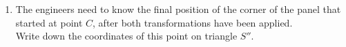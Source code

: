 \begin{question}
\begin{enumerate}
    \vspace{4cm}

    \item[(c)] The engineers need to know the final position of the corner of the panel that started at point $C$, after both transformations have been applied.\\
    Write down the coordinates of this point on triangle $S''$.

    \vspace{2cm}
\end{enumerate}
\end{question}
